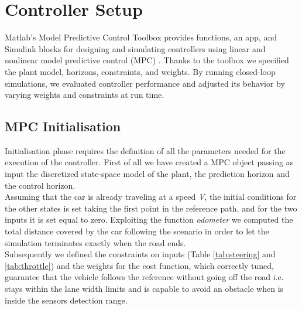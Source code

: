 \section{Controller Setup}
\label{chap:Controller}



Matlab's Model Predictive Control Toolbox provides functions, an app, and Simulink blocks for designing and simulating controllers using linear and nonlinear model predictive control (MPC) \cite{MPCToolbox}. Thanks to the toolbox we specified the plant model, horizons, constraints, and weights. By running closed-loop simulations, we evaluated controller performance and adjusted its behavior by varying weights and constraints at run time.

\subsection{MPC Initialisation}
Initialisation phase requires the definition of all the parameters needed for the execution of the controller.
First of all we have created a MPC object passing as input the discretized state-space model of the plant, the prediction horizon and the control horizon.
\\Assuming that the car is already traveling at a speed \textit{V}, the initial conditions for the other states is set taking the first point in the reference path, and for the two inputs it is set equal to zero. Exploiting the function \textit{odometer} we computed the total distance covered by the car following the scenario in order to let the simulation terminates exactly when the road ends.
\\Subsequently we defined the constraints on inputs (Table \ref{tab:steering} and \ref{tab:throttle}) and the weights for the cost function, which correctly tuned, guarantee that the vehicle follows the reference without going off the road  i.e. stays within the lane width limits and is capable to avoid an obstacle when is inside the sensors detection range.



